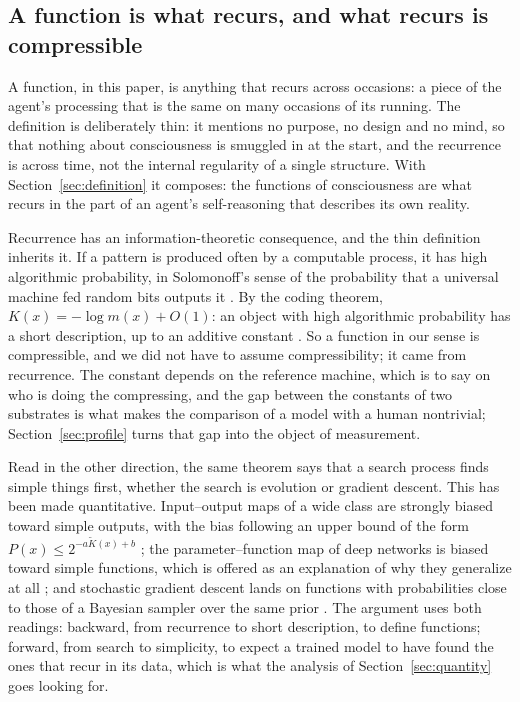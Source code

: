 \subsection{A function is what recurs, and what recurs is compressible}
\label{sec:function}

A function, in this paper, is anything that recurs across occasions: a piece of the agent's processing
that is the same on many occasions of its running. The definition is deliberately thin: it mentions no
purpose, no design and no mind, so that nothing about consciousness is smuggled in at the start, and the
recurrence is across time, not the internal regularity of a single structure. With
Section~\ref{sec:definition} it composes: the functions of consciousness are what recurs in the part of
an agent's self-reasoning that describes its own reality.

Recurrence has an information-theoretic consequence, and the thin definition inherits it. If a pattern
is produced often by a computable process, it has high algorithmic probability, in Solomonoff's sense
of the probability that a universal machine fed random bits outputs it
\citep{solomonoff1964a,solomonoff1964b}. By the coding theorem, $K(x) = -\log m(x) + O(1)$: an object
with high algorithmic probability has a short description, up to an additive constant
\citep{levin1974,livitanyi2019}. So a function in our sense is compressible, and we did not have to
assume compressibility; it came from recurrence. The constant depends on the reference machine, which
is to say on who is doing the compressing, and the gap between the constants of two substrates is what
makes the comparison of a model with a human nontrivial; Section~\ref{sec:profile} turns that gap into
the object of measurement.

Read in the other direction, the same theorem says that a search process finds simple things first,
whether the search is evolution or gradient descent. This has been made quantitative. Input--output
maps of a wide class are strongly biased toward simple outputs, with the bias following an upper bound
of the form $P(x) \le 2^{-a \tilde{K}(x) + b}$ \citep{dingle2018}; the parameter--function map of deep
networks is biased toward simple functions, which is offered as an explanation of why they generalize
at all \citep{valleperez2019}; and stochastic gradient descent lands on functions with probabilities
close to those of a Bayesian sampler over the same prior \citep{mingard2021}. The argument uses both
readings: backward, from recurrence to short description, to define functions; forward, from search to
simplicity, to expect a trained model to have found the ones that recur in its data, which is what
the analysis of Section~\ref{sec:quantity} goes looking for.

